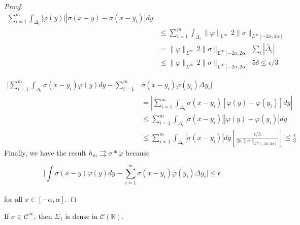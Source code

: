 \documentclass[../main.tex]{subfiles}
\begin{document}
\begin{proof}
		
		\begin{equation*}
			\begin{split}
				\sum_{i=1}^m  \int_{\tilde{\Delta_i}} \left| \varphi(y)\right| \left| \sigma(x-y)-\sigma(x-y_i)\right|dy & \\
				&  \leq  \sum_{i=1}^m  \int_{\tilde{\Delta_i}} \| \varphi\|_{L^{\infty}} \, 2 \| \sigma \|_{L^{\infty}[-2\alpha,2\alpha]} \\
				& = \| \varphi\|_{L^{\infty}} \, 2 \| \sigma \|_{L^{\infty}[-2\alpha,2\alpha]} \sum_i| \tilde{\Delta_i} | \\
				& \leq \| \varphi\|_{L^{\infty}} \, 2 \| \sigma \|_{L^{\infty}[-2\alpha,2\alpha]} \, 5 \delta \leq \epsilon /3
			\end{split}
		\end{equation*}

\begin{equation*} 
	\begin{split}
		\Bigg| \sum_{i=1}^m \int_{\Delta_i} \sigma(x-y_i)\varphi(y)dy -  \sum_{i=1}^m &\sigma(x-y_i) \varphi(y_i)\Delta y_i \Bigg| \\
		& =  \left|  \sum_{i=1}^m \int_{\Delta_i} \sigma(x-y_i) [\varphi(y)-\varphi(y_i)] dy \right| \\
		& \leq  \sum_{i=1}^m \int_{\Delta_i}  \left| \sigma(x-y_i)\right| \left| \varphi(y) - \varphi(y_i)\right|dy  \\
		& \leq  \sum_{i=1}^m \int_{\Delta_i}  \left| \sigma(x-y_i)\right| dy \left[ \frac{\epsilon/3}{2\alpha \| \sigma\|_{L^\infty[-2\alpha,2\alpha]}}\right]  \leq \frac{\epsilon}{3} 
	\end{split}
\end{equation*}
Finally, we have the result $h_m \rightrightarrows \sigma \ast \varphi $ because

$$\Bigg| \int \sigma(x-y)\varphi(y)dy -  \sum_{i=1}^m \sigma(x-y_i) \varphi(y_i) \Delta y_i \Bigg| \leq \epsilon $$
\\ for all $x\in [-\alpha,\alpha ].$
	\end{proof}
	
	\begin{lema} %
		If $\sigma \in \mathcal{C}^{\infty}$, then $ \Sigma_1$ is dense in  $\mathcal{C}(\mathbb{R})$.
	\end{lema}
	
\end{document}
